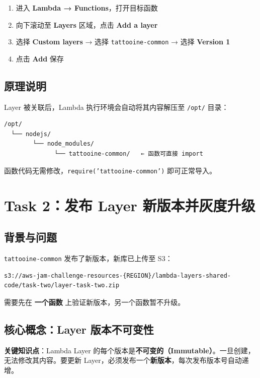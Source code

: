 \documentclass[12pt, a4paper]{article}
\begin{document}
\begin{enumerate}
  \item 进入 \textbf{Lambda → Functions}，打开目标函数
  \item 向下滚动至 \textbf{Layers} 区域，点击 \textbf{Add a layer}
  \item 选择 \textbf{Custom layers} → 选择 \texttt{tattooine-common} → 选择 \textbf{Version 1}
  \item 点击 \textbf{Add} 保存
\end{enumerate}

\subsection{原理说明}

Layer 被关联后，Lambda 执行环境会自动将其内容解压至 \texttt{/opt/} 目录：

\begin{lstlisting}
/opt/
  └── nodejs/
        └── node_modules/
              └── tattooine-common/   ← 函数可直接 import
\end{lstlisting}

函数代码无需修改，\texttt{require('tattooine-common')} 即可正常导入。

\section{Task 2：发布 Layer 新版本并灰度升级}

\subsection{背景与问题}

\texttt{tattooine-common} 发布了新版本，新库已上传至 S3：

\begin{lstlisting}
s3://aws-jam-challenge-resources-{REGION}/lambda-layers-shared-code/task-two/layer-task-two.zip
\end{lstlisting}

需要先在 \textbf{一个函数} 上验证新版本，另一个函数暂不升级。

\subsection{核心概念：Layer 版本不可变性}

\begin{tipbox}
\textbf{关键知识点}：Lambda Layer 的每个版本是\textbf{不可变的（Immutable）}。一旦创建，无法修改其内容。要更新 Layer，必须发布一个\textbf{新版本}，每次发布版本号自动递增。
\end{tipbox}
\end{document}
